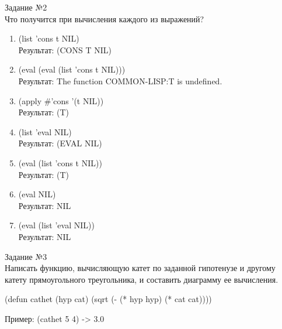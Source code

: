 {\LARGE Задание №2}\\

Что получится при вычисления каждого из выражений?
\begin{enumerate}
\item (list 'cons t NIL)\\
Результат: (CONS T NIL)
\item (eval (eval (list 'cons t NIL)))\\
Результат: The function COMMON-LISP:T is undefined.
\item (apply \#'cons '(t NIL))\\
Результат: (T)
\item (list 'eval NIL)\\
Результат: (EVAL NIL)
\item (eval (list 'cons t NIL))\\
Результат: (T)
\item (eval NIL)\\
Результат: NIL
\item (eval (list 'eval NIL))\\
Результат: NIL\\
\end{enumerate}

\newpage
\vspace*{10mm}
{\LARGE Задание №3}\\

Написать функцию, вычисляющую катет по заданной гипотенузе и другому катету прямоугольного треугольника, и составить диаграмму ее вычисления.

(defun cathet (hyp cat) (sqrt (- (* hyp hyp) (* cat cat))))

Пример: (cathet 5 4) -> 3.0
\begin{figure}[ht!]
\end{figure}

